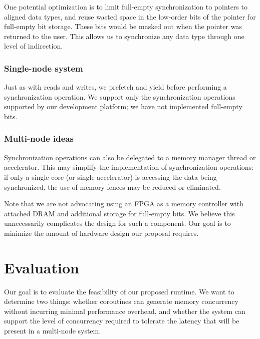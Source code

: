 \documentclass[10pt,nocopyrightspace,preprint]{sigplanconf}
\begin{document}
One potential optimization is to limit full-empty synchronization to
pointers to aligned data types, and reuse wasted space in the
low-order bits of the pointer for full-empty bit storage. These bits
would be masked out when the pointer was returned to the user.  This
allows us to synchronize any data type through one level of
indirection.

\subsubsection{Single-node system}
Just as with reads and writes, we prefetch and yield before performing
a synchronization operation. We support only the synchronization
operations supported by our development platform; we have not
implemented full-empty bits.

\subsubsection{Multi-node ideas}

Synchronization operations can also be delegated to a memory manager
thread or accelerator. This may simplify the implementation of
synchronization operations: if only a single core (or single
accelerator) is accessing the data being synchronized, the use of
memory fences may be reduced or eliminated.

Note that we are not advocating using an FPGA as a memory controller
with attached DRAM and additional storage for full-empty bits. We
believe this unnecessarily complicates the design for such a
component. Our goal is to minimize the amount of hardware design our
proposal requires.


\section{Evaluation}
\label{sec:evaluation}

Our goal is to evaluate the feasibility of our proposed runtime. We want to determine two things: whether coroutines can generate memory concurrency without incurring minimal performance overhead, and whether the system can support the level of concurrency required to tolerate the latency that will be present in a multi-node system.
\end{document}
